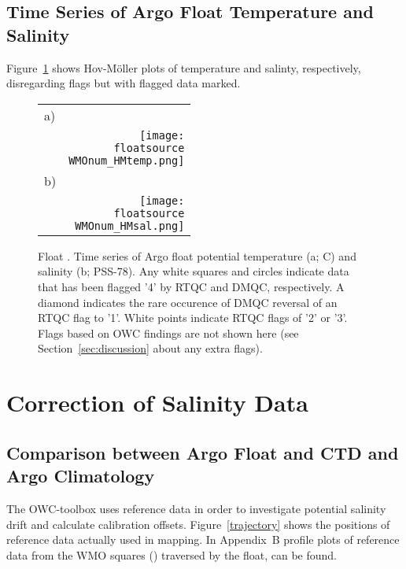 \documentclass{article}
\begin{document}
\subsection{Time Series of Argo Float Temperature and Salinity}
%
Figure~\ref{hovmoller} shows Hov-M{\"o}ller plots of temperature and
salinty, respectively, disregarding flags but with flagged data marked.
\begin{figure}[H]
  \centering
  \begin{tabular}{lr}
  a) & \\
  &\texttt{[image: \\floatsource\\WMOnum\_HMtemp.png]}\\
  b)& \\
  &\texttt{[image: \\floatsource\\WMOnum\_HMsal.png]}
  \end{tabular}
  \caption{Float \WMOnum. Time series of Argo float potential temperature
    (a; \textdegree C) and salinity (b; PSS-78). Any white squares and
  circles indicate data that has been flagged '4' by RTQC and DMQC, respectively. 
  A diamond indicates the rare occurence of DMQC reversal of an RTQC flag to '1'.
  White points indicate RTQC flags of '2' or '3'. 
  Flags based on OWC findings are not shown here (see Section~\ref{sec:discussion} about any extra flags).}
\label{hovmoller}
\end{figure}



\newpage
\section{Correction of Salinity Data}\label{sec:OWC}
%

\subsection{Comparison between Argo Float and CTD and Argo Climatology} 
%
The OWC-toolbox uses reference data in order to investigate potential
salinity drift and calculate calibration offsets. Figure~\ref{trajectory}
shows the positions of reference data actually used in mapping. In 
Appendix~B profile plots of reference data from the WMO squares
() traversed by the float, can be found.
\end{document}
